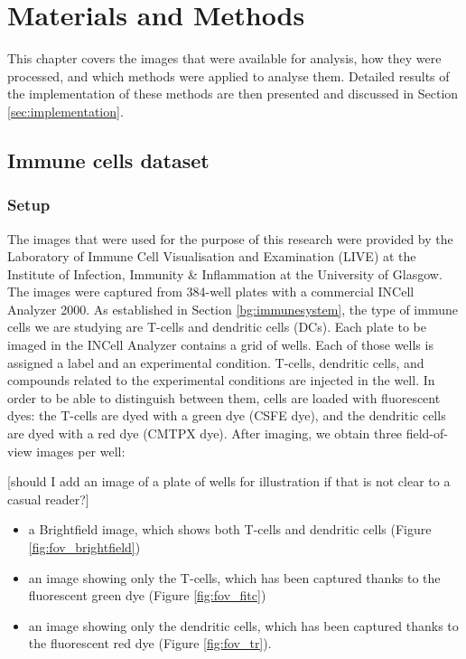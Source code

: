 \chapter{Materials and Methods} \label{sec:mm}

This chapter covers the images that were available for analysis, how they were processed, and which methods were applied to analyse them. Detailed results of the implementation of these methods are then presented and discussed in Section \ref{sec:implementation}.

\section{Immune cells dataset}

\subsection{Setup}

The images that were used for the purpose of this research were provided by the Laboratory of Immune Cell Visualisation and Examination (LIVE) at the Institute of Infection, Immunity \& Inflammation at the University of Glasgow. The images were captured from 384-well plates with a commercial INCell Analyzer 2000. As established in Section \ref{bg:immunesystem}, the type of immune cells we are studying are T-cells and dendritic cells (DCs). Each plate to be imaged in the INCell Analyzer contains a grid of wells. Each of those wells is assigned a label and an experimental condition. T-cells, dendritic cells, and compounds related to the experimental conditions are injected in the well. In order to be able to distinguish between them, cells are loaded with fluorescent dyes: the T-cells are dyed with a green dye (CSFE dye), and the dendritic cells are dyed with a red dye (CMTPX dye). After imaging, we obtain three field-of-view images per well:

[should I add an image of a plate of wells for illustration if that is not clear to a casual reader?]

\begin{itemize}
    \item a Brightfield image, which shows both T-cells and dendritic cells (Figure \ref{fig:fov_brightfield})
    \item an image showing only the T-cells, which has been captured thanks to the fluorescent green dye (Figure \ref{fig:fov_fitc})
    \item an image showing only the dendritic cells, which has been captured thanks to the fluorescent red dye (Figure \ref{fig:fov_tr}).
\end{itemize}

